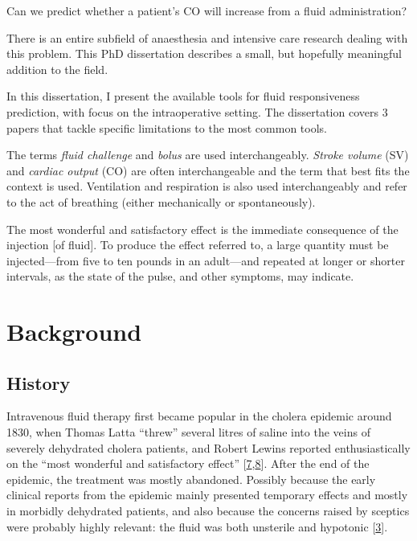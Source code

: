 \documentclass[a4paper, nobind]{templates/ociamthesis}
\begin{document}
Can we predict whether a patient's CO will increase from a fluid administration?

There is an entire subfield of anaesthesia and intensive care research dealing with this problem.
This PhD dissertation describes a small, but hopefully meaningful addition to the field.

In this dissertation, I present the available tools for fluid responsiveness prediction, with focus on the intraoperative setting. The dissertation covers 3 papers that tackle specific limitations to the most common tools.

The terms \emph{fluid challenge} and \emph{bolus} are used interchangeably. \emph{Stroke volume} (SV) and \emph{cardiac output} (CO) are often interchangeable and the term that best fits the context is used. Ventilation and respiration is also used interchangeably and refer to the act of breathing (either mechanically or spontaneously).

\begin{savequote}
The most wonderful and satisfactory effect is the immediate consequence
of the injection {[}of fluid{]}. To produce the effect referred to, a
large quantity must be injected---from five to ten pounds in an
adult---and repeated at longer or shorter intervals, as the state of the
pulse, and other symptoms, may indicate.
\end{savequote}



\hypertarget{background}{%
\chapter{Background}\label{background}}

\hypertarget{history}{%
\section{History}\label{history}}

Intravenous fluid therapy first became popular in the cholera epidemic around 1830, when Thomas Latta ``threw'' several litres of saline into the veins of severely dehydrated cholera patients, and Robert Lewins reported enthusiastically on the ``most wonderful and satisfactory effect'' {[}\protect\hyperlink{ref-lattaMALIGNANTCHOLERADOCUMENTS1832}{7},\protect\hyperlink{ref-lewinsInjectionSalineSolutions1832}{8}{]}. After the end of the epidemic, the treatment was mostly abandoned. Possibly because the early clinical reports from the epidemic mainly presented temporary effects and mostly in morbidly dehydrated patients, and also because the concerns raised by sceptics were probably highly relevant: the fluid was both unsterile and hypotonic {[}\protect\hyperlink{ref-cosnettOriginsIntravenousFluid1989}{3}{]}.
\end{document}
